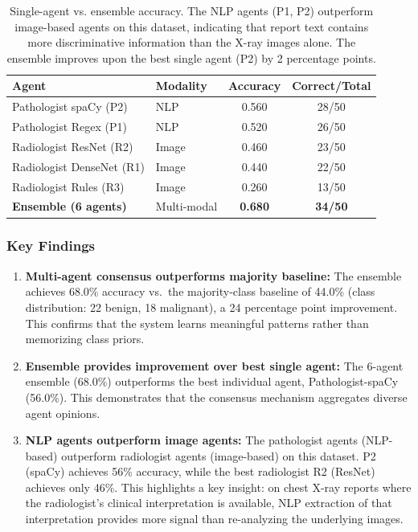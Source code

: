 \documentclass[12pt]{article}
\begin{document}
\begin{table}[ht]
\centering
\small
\begin{tabular}{llcc}
\toprule
\textbf{Agent} & \textbf{Modality} & \textbf{Accuracy} & \textbf{Correct/Total} \\
\midrule
Pathologist spaCy (P2) & NLP & 0.560 & 28/50 \\
Pathologist Regex (P1) & NLP & 0.520 & 26/50 \\
Radiologist ResNet (R2) & Image & 0.460 & 23/50 \\
Radiologist DenseNet (R1) & Image & 0.440 & 22/50 \\
Radiologist Rules (R3) & Image & 0.260 & 13/50 \\
\midrule
\textbf{Ensemble (6 agents)} & Multi-modal & \textbf{0.680} & \textbf{34/50} \\
\bottomrule
\end{tabular}
\caption{Single-agent vs. ensemble accuracy. The NLP agents (P1, P2) outperform image-based agents on this dataset, indicating that report text contains more discriminative information than the X-ray images alone. The ensemble improves upon the best single agent (P2) by 2 percentage points.}
\label{tab:agent-accuracies}
\end{table}

\subsubsection{Key Findings}

\begin{enumerate}
    \item \textbf{Multi-agent consensus outperforms majority baseline:} The ensemble achieves 68.0\% accuracy vs.\ the majority-class baseline of 44.0\% (class distribution: 22 benign, 18 malignant), a 24 percentage point improvement. This confirms that the system learns meaningful patterns rather than memorizing class priors.
    
    \item \textbf{Ensemble provides improvement over best single agent:} The 6-agent ensemble (68.0\%) outperforms the best individual agent, Pathologist-spaCy (56.0\%). This demonstrates that the consensus mechanism aggregates diverse agent opinions.
    
    \item \textbf{NLP agents outperform image agents:} The pathologist agents (NLP-based) outperform radiologist agents (image-based) on this dataset. P2 (spaCy) achieves 56\% accuracy, while the best radiologist R2 (ResNet) achieves only 46\%. This highlights a key insight: on chest X-ray reports where the radiologist's clinical interpretation is available, NLP extraction of that interpretation provides more signal than re-analyzing the underlying images.
\end{enumerate}
\end{document}
